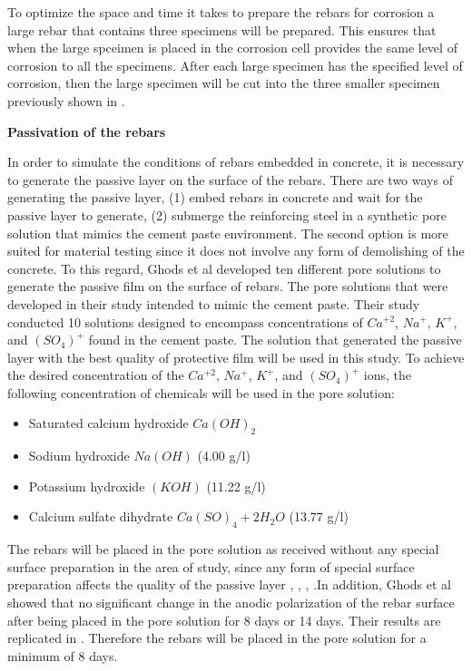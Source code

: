 To optimize the space and time it takes to prepare the rebars for corrosion a large rebar that contains three specimens will be prepared. This ensures that when the large spceimen is placed in the corrosion cell provides the same level of corrosion to all the specimens. After each large specimen has the specified level of corrosion, then the large specimen will be cut into the three smaller specimen previously shown in .

\newpage

\textbf{Passivation of the rebars}

In order to simulate the conditions of rebars embedded in concrete, it is necessary to generate the passive layer on the surface of the rebars. There are two ways of generating the passive layer, (1) embed rebars in concrete and wait for the passive layer to generate, (2) submerge the reinforcing steel in a synthetic pore solution that mimics the cement paste environment. The second option is more suited for material testing since it does not involve any form of demolishing of the concrete. To this regard, Ghods et al \cite{Ghods2010} developed ten different pore solutions to generate the passive film on the surface of rebars. The pore solutions that were developed in their study intended to mimic the cement paste. Their study conducted 10 solutions designed to encompass concentrations of $Ca^{+2}$, $Na^{+}$, $K^{+}$, and $(SO_{4})^{+}$ found in the cement paste. The solution that generated the passive layer with the best quality of protective film will be used in this study. To achieve the desired concentration of the $Ca^{+2}$, $Na^{+}$, $K^{+}$, and $(SO_{4})^{+}$ ions, the following concentration of chemicals will be used in the pore solution:

\begin{itemize}
	\item Saturated calcium hydroxide $Ca(OH)_2$
	\item Sodium hydroxide $Na(OH)$ (4.00 g/l)
	\item Potassium hydroxide $(KOH)$ (11.22 g/l)
	\item Calcium sulfate dihydrate $Ca(SO)_4 + 2H_2O$ (13.77 g/l)
\end{itemize}

The rebars will be placed in the pore solution as received without any special surface preparation in the area of study, since any form of special surface preparation affects the quality of the passive layer \cite{Andersson1989}, \cite{DawnMarcotte2001}, \cite{Moragues1987}, \cite{Page1983}.In addition, Ghods et al showed that no significant change in the anodic polarization of the rebar surface after being placed in the pore solution for 8 days or 14 days. Their results are replicated in . Therefore the rebars will be placed in the pore solution for a minimum of 8 days. 

